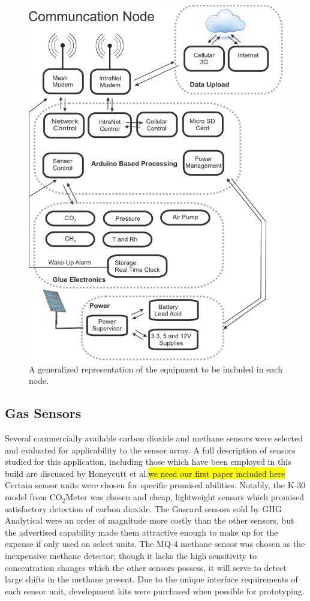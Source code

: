 \documentclass[numbook, envcountsect, envcountsame, envcountreset, runningheads, twocolumn]{svjour3}
\begin{document}
		\begin{figure}[!t]
			\centering
			\includegraphics[width=\columnwidth,height=\columnwidth,keepaspectratio]{outline.pdf}
			\caption[Equipment outline]{A generalized representation of the equipment to be included in each node.}
			\label{fig:outline}
		\end{figure}
		
		\subsection{Gas Sensors}
			
			Several commercially available carbon dioxide and methane sensors were selected and evaluated for applicability to the sensor array. A full description of sensors studied for this application, including those which have been employed in this build are discussed by Honeycutt et al.\hl{we need our first paper included here}  Certain sensor units were chosen for specific promised abilities.  Notably, the K-30 model from CO$_2$Meter was chosen and cheap, lightweight sensors which promised satisfactory detection of carbon dioxide.  The Gascard sensors sold by GHG Analytical were an order of magnitude more costly than the other sensors, but the advertised capability made them attractive enough to make up for the expense if only used on select units.  The MQ-4 methane sensor was chosen as the inexpensive methane detector; though it lacks the high sensitivity to concentration changes which the other sensors possess, it will serve to detect large shifts in the methane present.  Due to the unique interface requirements of each sensor unit, development kits were purchased when possible for prototyping.  
		
\end{document}
